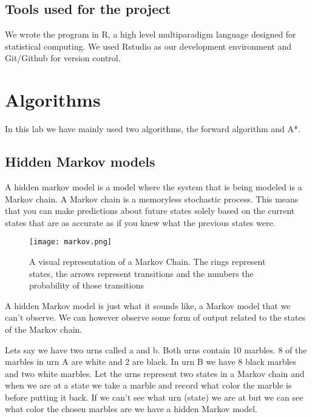 \documentclass[12pt, a4paper]{article}
\begin{document}
\subsection{Tools used for the project}

We wrote the program in R, a high level multiparadigm language designed for statistical computing. We used Rstudio as our development environment and Git/Github for version control. 

\section{Algorithms}

In this lab we have mainly used two algorithms, the forward algorithm and A*. 

\subsection{Hidden Markov models}

A hidden markov model is a model where the system that is being modeled is a Markov chain. A Markov chain is a memoryless stochastic process.  This means that you can make predictions about future states solely based on the current states that are as accurate as if you knew what the previous states were. 

\begin{figure}[!ht]
\centering
\texttt{[image: markov.png]}\\
\caption{A visual representation of a Markov Chain. The rings represent states, the arrows represent transitions and the numbers the probability of those transitions}
\label{mmp_mmd-box}
\end{figure}
\vspace{2.5mm}

A hidden Markov model is just what it sounds like, a Markov model that we can't observe. We can however observe some form of output related to the states of the Markov chain. 

Lets say we have two urns called a and b. Both urns contain 10 marbles. 8 of the marbles in urn A are white and 2 are black. In urn B we have 8 black marbles and two white marbles. Let the urns represent two states in a Markov chain and when we are at a state we take a marble and record what color the marble is before putting it back. If we can't see what urn (state) we are at but we can see what color the chosen marbles are we have a hidden Markov model.
\end{document}
